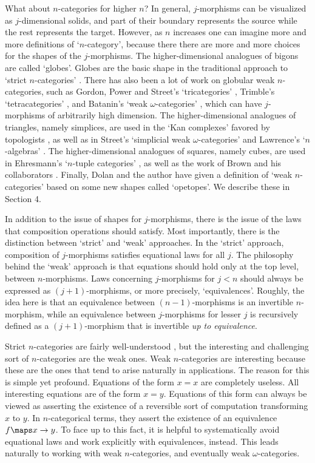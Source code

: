 What about $n$-categories for higher $n$?  In general, $j$-morphisms can
be visualized as $j$-dimensional solids, and part of their boundary
represents the source while the rest represents the target.  However,
as $n$ increases one can imagine more and more definitions of
`$n$-category', because there there are more and more choices for the
shapes of the $j$-morphisms.  The higher-dimensional analogues of bigons
are called `globes'.  Globes are the basic shape in the traditional
approach to `strict $n$-categories' \cite{EK,Crans}.  There has also
been a lot of work on globular weak $n$-categories, such as Gordon,
Power and Street's `tricategories' \cite{GPS}, Trimble's
`tetracategories' \cite{Trimble}, and Batanin's `weak
$\omega$-categories' \cite{Batanin}, which can have $j$-morphisms of
arbitrarily high dimension.  The higher-dimensional analogues of
triangles, namely simplices, are used in the `Kan complexes' favored by
topologists \cite{May}, as well as in Street's `simplicial weak
$\omega$-categories' \cite{Street} and Lawrence's `$n$-algebras'
\cite{Lawrence}.  The higher-dimensional analogues of squares, namely
cubes, are used in Ehresmann's `$n$-tuple categories' \cite{Ehresmann},
as well as the work of Brown and his collaborators \cite{Brown}.
Finally, Dolan and the author \cite{BD2} have given a definition of
`weak $n$-categories' based on some new shapes called `opetopes'.  We
describe these in Section 4.

In addition to the issue of shapes for $j$-morphisms, there is the issue
of the laws that composition operations should satisfy.  Most
importantly, there is the distinction between `strict' and `weak'
approaches.  In the `strict' approach, composition of $j$-morphisms
satisfies equational laws for all $j$.  The philosophy behind the `weak'
approach is that equations should hold only at the top level,
between $n$-morphisms.   Laws concerning $j$-morphisms for $j < n$
should always be expressed as $(j+1)$-morphisms, or more precisely, 
`equivalences'.  Roughly, the idea here is that an equivalence between
$(n-1)$-morphisms is an invertible $n$-morphism, while an equivalence
between $j$-morphisms for lesser $j$ is recursively defined as a
$(j+1)$-morphism that is invertible {\it up to equivalence}.  

Strict $n$-categories are fairly well-understood \cite{Crans}, but the
interesting and challenging sort of $n$-categories are the weak ones.
Weak $n$-categories are interesting because these are the ones that tend
to arise naturally in applications.  The reason for this is simple yet
profound.  Equations of the form $x = x$ are completely useless.  All
interesting equations are of the form $x = y$.  Equations of this
form can always be viewed as asserting the existence of a reversible
sort of computation transforming $x$ to $y$.  In $n$-categorical terms,
they assert the existence of an equivalence $f \maps x \to y$.  To face
up to this fact, it is helpful to systematically avoid equational laws
and work explicitly with equivalences, instead.  This leads naturally to
working with weak $n$-categories, and eventually weak $\omega$-categories.

